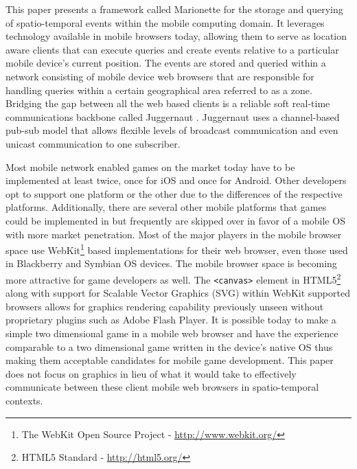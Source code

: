 \documentclass[12pt]{report}	%
\theoremstyle{definition}
\theoremstyle{remark}
\begin{document}
This paper presents a framework called Marionette for the storage and
querying of spatio-temporal events within the mobile computing domain.
It leverages technology available in mobile browsers today, allowing
them to serve as location aware clients that can execute queries and
create events relative to a particular mobile device's current position. The events are
stored and queried within a network consisting of mobile device web
browsers that are responsible for handling queries within a certain
geographical area referred to as a zone. Bridging the gap between all
the web based clients is a reliable soft real-time communications
backbone called Juggernaut \cite{juggernaut}. Juggernaut uses a channel-based pub-sub
model that allows flexible levels of broadcast communication and even
unicast communication to one subscriber.

Most mobile network enabled games on the market today have to be
implemented at least twice, once for iOS and once for Android. Other
developers opt to support one platform or the other due to the
differences of the respective platforms. Additionally, there are several
other mobile platforms that games could be implemented in but frequently are
skipped over in favor of a mobile OS with more market penetration. Most
of the major players in the mobile browser space use WebKit\footnote{The 
WebKit Open Source Project - \url{http://www.webkit.org/}} based
implementations for their web browser, even those used in Blackberry and
Symbian OS devices. The mobile browser space is becoming more attractive
for game developers as well. The \texttt{<canvas>} element in 
HTML5\footnote{HTML5 Standard - \url{http://html5.org/}} along with
support for Scalable Vector Graphics (SVG) within WebKit supported
browsers allows for graphics rendering capability previously unseen without
proprietary plugins such as Adobe Flash Player. It is possible today to
make a simple two dimensional game in a mobile web browser and have the
experience comparable to a two dimensional game written in the device's native
OS thus making them acceptable candidates for mobile game development. 
This paper does not focus on graphics in lieu of what it would take to 
effectively communicate between these client mobile web browsers in 
spatio-temporal contexts.
\end{document}
